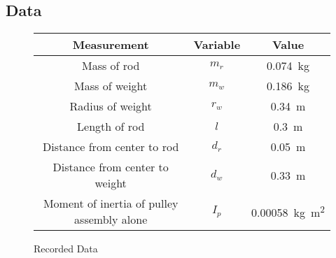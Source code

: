 \documentclass[article, 11pt]{article}
\begin{document}
    \subsection{Data}
    \begin{figure}[H]
        \begin{center}
            \begin{tabular}{|c|c|c|}
                \hline
                \textbf{Measurement} & \textbf{Variable} & \textbf{Value} \\
                \hline
                Mass of rod & $m_r$ & \SI{0.074}{\kilogram} \\
                Mass of weight & $m_w$ & \SI{0.186}{\kilogram} \\
                Radius of weight & $r_w$ & \SI{0.34}{\meter} \\
                Length of rod & $l$ & \SI{0.3}{\meter} \\
                Distance from center to rod & $d_r$ & \SI{0.05}{\meter} \\
                Distance from center to weight & $d_w$ & \SI{0.33}{\meter} \\
                Moment of inertia of pulley assembly alone & $I_p$ & \SI{0.00058}{\kilogram\meter^2} \\
                \hline
            \end{tabular}
        \end{center}
        \caption{Recorded Data}
    \end{figure}
\end{document}
